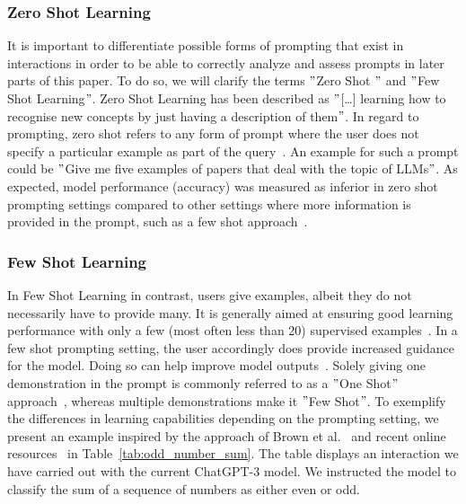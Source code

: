 
\subsubsection{Zero Shot Learning} %
It is important to differentiate possible forms of prompting that exist in interactions in order
to be able to correctly analyze and assess prompts in later parts of this paper.
To do so, we will clarify the terms \("\)Zero Shot \("\) and \("\)Few Shot Learning\("\).
Zero Shot Learning has been described as \("\)[\ldots] learning how to recognise
new concepts by just having a description of them\("\)\cite[p. 1]{feris_embarrassingly_2015}.
In regard to prompting, zero shot refers to any form of prompt where the user does not specify
a particular example as part of the query~\cite[p. 1]{dang_how_2022}.
An example for such a prompt could be \("\)Give me five examples of papers that deal with the topic
of LLMs\("\).
As expected, model performance (accuracy) was measured as inferior in zero shot prompting
settings compared
to other settings where more information is provided in the prompt, such as a few shot approach~\cite[p. 5]{brown_language_2020}.


\subsubsection{Few Shot Learning}
In Few Shot Learning in contrast, users give examples, albeit they do not necessarily have to
provide many.
It is generally aimed at ensuring good learning performance with only a few (most often less than 20)
supervised examples~\cite[p. 1]{samuel_offline_2022}. %
In a few shot prompting setting, the user accordingly does provide increased guidance for the model.
Doing so can help improve model outputs~\cite[p. 1]{dang_how_2022}.
Solely giving one demonstration in the prompt is commonly referred to as a \("\)One Shot\("\)
approach~\cite[p. 6]{brown_language_2020},
whereas multiple demonstrations make it \("\)Few Shot\("\).
To exemplify the differences in learning capabilities depending on the prompting setting,
we present an example inspired by the approach of Brown et al\(.\)~\cite{brown_language_2020}
and recent online resources~\cite{dairai_few-shot_2023} in Table~\ref{tab:odd_number_sum}.
The table displays an interaction we have carried out with the current ChatGPT-3 model.
We instructed the model to classify the sum of a sequence of numbers as either even or odd.

